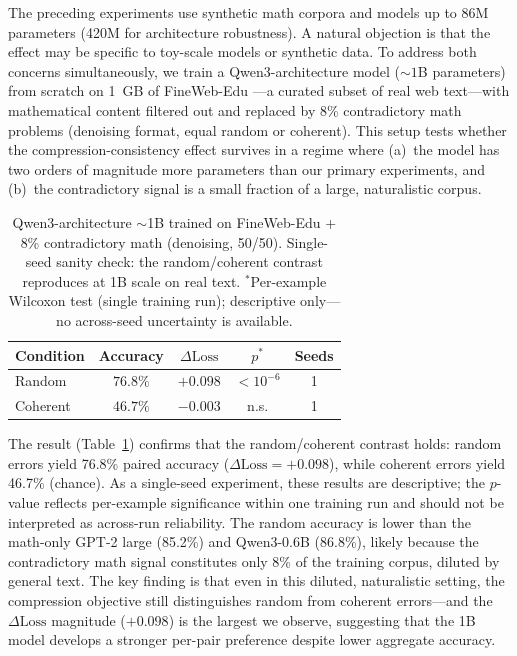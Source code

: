 \documentclass{article}
\begin{document}
The preceding experiments use synthetic math corpora and models up to 86M parameters (420M for architecture robustness). A natural objection is that the effect may be specific to toy-scale models or synthetic data. To address both concerns simultaneously, we train a Qwen3-architecture model (${\sim}1$B parameters) from scratch on 1~GB of FineWeb-Edu \citep{penedo2024fineweb}---a curated subset of real web text---with mathematical content filtered out and replaced by 8\% contradictory math problems (denoising format, equal random or coherent). This setup tests whether the compression-consistency effect survives in a regime where (a)~the model has two orders of magnitude more parameters than our primary experiments, and (b)~the contradictory signal is a small fraction of a large, naturalistic corpus.

\begin{table}[t]
\centering
\begin{tabular}{lcccc}
\toprule
Condition & Accuracy & $\Delta\text{Loss}$ & $p^*$ & Seeds \\
\midrule
Random   & $\mathbf{76.8\%}$ & $+0.098$ & $< 10^{-6}$ & 1 \\
Coherent & $46.7\%$ & $-0.003$ & n.s. & 1 \\
\bottomrule
\end{tabular}
\caption{Qwen3-architecture ${\sim}$1B trained on FineWeb-Edu + 8\% contradictory math (denoising, 50/50). Single-seed sanity check: the random/coherent contrast reproduces at 1B scale on real text. $^*$Per-example Wilcoxon test (single training run); descriptive only---no across-seed uncertainty is available.}
\label{tab:qwen1b}
\end{table}

The result (Table~\ref{tab:qwen1b}) confirms that the random/coherent contrast holds: random errors yield 76.8\% paired accuracy ($\Delta\text{Loss} = +0.098$), while coherent errors yield 46.7\% (chance). As a single-seed experiment, these results are descriptive; the $p$-value reflects per-example significance within one training run and should not be interpreted as across-run reliability. The random accuracy is lower than the math-only GPT-2 large (85.2\%) and Qwen3-0.6B (86.8\%), likely because the contradictory math signal constitutes only 8\% of the training corpus, diluted by general text. The key finding is that even in this diluted, naturalistic setting, the compression objective still distinguishes random from coherent errors---and the $\Delta\text{Loss}$ magnitude ($+0.098$) is the largest we observe, suggesting that the 1B model develops a stronger per-pair preference despite lower aggregate accuracy.
\end{document}
